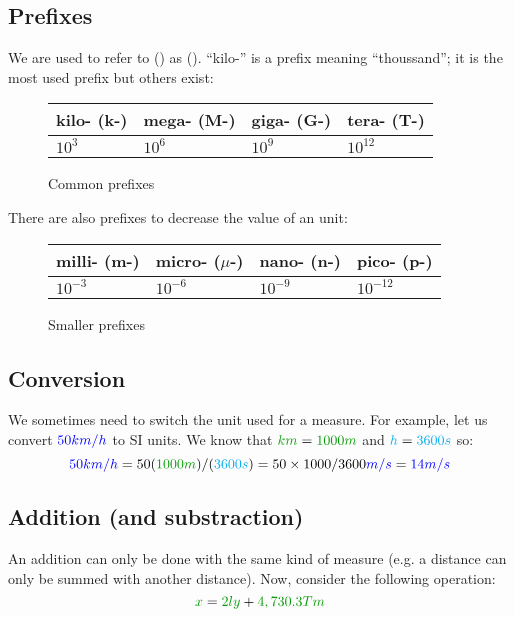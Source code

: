 \subsection{Prefixes}

We are used to refer to  () as  (). “kilo-” is a prefix meaning “thoussand”;
it is the most used prefix but others exist:

\begin{figure}[H]
	\centering
	\begin{tabular}{l|l|l|l}
		kilo- (k-) & mega- (M-) & giga- (G-) & tera- (T-) \\
		\hline
		$10^3$     & $10^6$     & $10^9$     & $10^{12}$  \\
	\end{tabular}
	\caption{Common prefixes}
\end{figure}

\begin{remark}
There are also prefixes to decrease the value of an unit:

\begin{figure}[H]
	\centering
	\begin{tabular}{l|l|l|l}
		milli- (m-) & micro- ($\mu$-) & nano- (n-) & pico- (p-) \\
		\hline
		$10^{-3}$   & $10^{-6}$       & $10^{-9}$  & $10^{-12}$ \\
	\end{tabular}
	\caption{Smaller prefixes}
\end{figure}
\end{remark}

\subsection{Conversion}

We sometimes need to switch the unit used for a measure. For example,
let us convert $\textcolor{blue}{50 km/h}$ to SI units. We know that $\dist{km} = \dist{1000 m}$ and $\textcolor{cyan}{h} =
\textcolor{cyan}{3600 s}$ so:
\[
\speed{50 km/h}
= 50 (\dist{1000m})/(\delay{3600s})
= 50 \times 1000 / 3600 \speed{m/s}
= \speed{14 m/s}
\]

\subsection{Addition (and substraction)}

An addition can only be done with the same kind of measure (e.g. a
distance can only be summed with another distance). Now, consider the
following operation:
\[
\dist{x} = \dist{2 ly} + \dist{4,730.3 Tm}
\]

